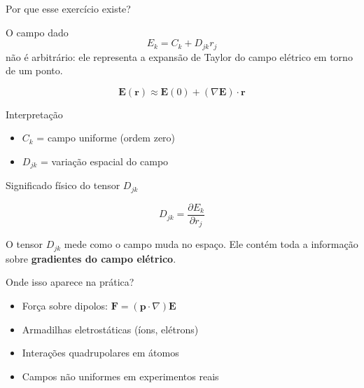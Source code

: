 \documentclass[aspectratio=169,11pt]{beamer}
\begin{document}
\begin{frame}{Por que esse exercício existe?}

\begin{mybox}
\justifying
O campo dado
\[
E_k = C_k + D_{jk} r_j
\]
não é arbitrário: ele representa a \alert{expansão de Taylor} do campo elétrico em torno de um ponto.
\end{mybox}

\vspace{0.2cm}

\begin{eqbox}
\begin{equation}
\mathbf{E}(\mathbf{r})
\approx
\mathbf{E}(0)
+
(\nabla \mathbf{E})\cdot \mathbf{r}
\end{equation}
\end{eqbox}

\vspace{0.2cm}

\begin{block}{Interpretação}
\begin{itemize}
    \item \(C_k\) = campo uniforme (ordem zero)
    \item \(D_{jk}\) = variação espacial do campo
\end{itemize}
\end{block}

\end{frame}

\begin{frame}{Significado físico do tensor \(D_{jk}\)}

\begin{eqbox}
\begin{equation}
D_{jk} = \frac{\partial E_k}{\partial r_j}
\end{equation}
\end{eqbox}

\vspace{0.2cm}

\begin{mybox}
\justifying
O tensor \(D_{jk}\) mede \alert{como o campo muda no espaço}.  
Ele contém toda a informação sobre \textbf{gradientes do campo elétrico}.
\end{mybox}

\vspace{0.2cm}

\begin{block}{Onde isso aparece na prática?}
\begin{itemize}
    \item Força sobre dipolos: \(\mathbf{F}=(\mathbf{p}\cdot\nabla)\mathbf{E}\)
    \item Armadilhas eletrostáticas (íons, elétrons)
    \item Interações quadrupolares em átomos
    \item Campos não uniformes em experimentos reais
\end{itemize}
\end{block}

\end{frame}
\end{document}
